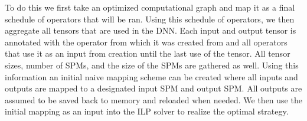 To do this we first take an optimized computational graph and map it as a final
schedule of operators that will be ran. Using this schedule of operators, we
then aggregate all tensors that are used in the DNN. Each input and output
tensor is annotated with the operator from which it was created from and all
operators that use it as an input from creation until the last use of the
tensor. All tensor sizes, number of SPMs, and the size of the SPMs are gathered
as well. Using this information an initial naive mapping scheme can be created
where all inputs and outputs are mapped to a designated input SPM and output
SPM. All outputs are assumed to be saved back to memory and reloaded when
needed. We then use the initial mapping as an input into the ILP solver to realize the
optimal strategy.
